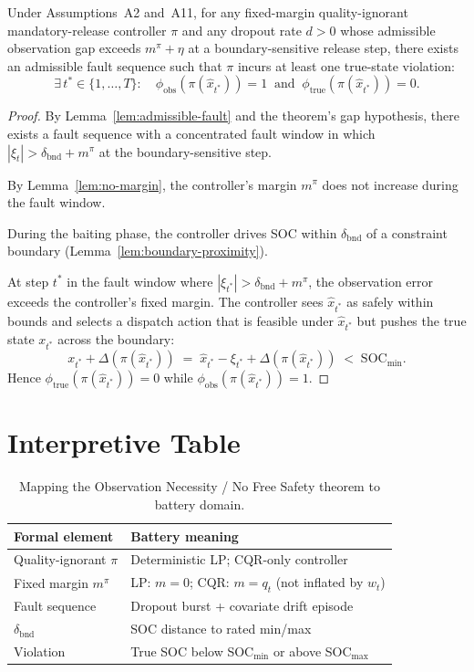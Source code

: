 \begin{theorem}
\label{thm:no-free-safety}
Under Assumptions~A2 and~A11, for any fixed-margin quality-ignorant
mandatory-release controller $\pi$ and any dropout rate $d > 0$ whose
admissible observation gap exceeds $m^\pi+\eta$ at a boundary-sensitive release
step, there exists an admissible fault sequence such that $\pi$ incurs at least
one true-state violation:
\[
  \exists\,t^* \in \{1, \ldots, T\} : \quad
  \phi_{\text{obs}}(\pi(\hat{x}_{t^*})) = 1 \;\;\text{and}\;\;
  \phi_{\text{true}}(\pi(\hat{x}_{t^*})) = 0.
\]
\end{theorem}

\begin{proof}
By Lemma~\ref{lem:admissible-fault} and the theorem's gap hypothesis, there
exists a fault sequence with a concentrated fault window in which
$|\xi_t| > \delta_{\text{bnd}}+m^\pi$ at the boundary-sensitive step.

By Lemma~\ref{lem:no-margin}, the controller's margin $m^{\pi}$ does
not increase during the fault window.

During the baiting phase, the controller drives SOC within
$\delta_{\text{bnd}}$ of a constraint boundary
(Lemma~\ref{lem:boundary-proximity}).

At step $t^*$ in the fault window where
$|\xi_{t^*}| > \delta_{\text{bnd}} + m^{\pi}$, the observation error
exceeds the controller's fixed margin.  The controller sees
$\hat{x}_{t^*}$ as safely within bounds and selects a dispatch action
that is feasible under $\hat{x}_{t^*}$ but pushes the true state
$x_{t^*}$ across the boundary:
\[
  x_{t^*} + \Delta(\pi(\hat{x}_{t^*}))
  \;=\; \hat{x}_{t^*} - \xi_{t^*} + \Delta(\pi(\hat{x}_{t^*}))
  \;<\; \text{SOC}_{\min}.
\]
Hence $\phi_{\text{true}}(\pi(\hat{x}_{t^*})) = 0$ while
$\phi_{\text{obs}}(\pi(\hat{x}_{t^*})) = 1$.
\end{proof}

\section{Interpretive Table}

\begin{table}[ht]
\centering
\caption{Mapping the Observation Necessity / No Free Safety theorem to battery domain.}
\label{tab:no-free-safety-interp}
\begin{tabular}{ll}
\toprule
\textbf{Formal element} & \textbf{Battery meaning} \\
\midrule
Quality-ignorant $\pi$ & Deterministic LP; CQR-only controller \\
Fixed margin $m^{\pi}$ & LP: $m = 0$; CQR: $m = q_t$ (not inflated by $w_t$) \\
Fault sequence & Dropout burst + covariate drift episode \\
$\delta_{\text{bnd}}$ & SOC distance to rated min/max \\
Violation & True SOC below SOC$_{\min}$ or above SOC$_{\max}$ \\
\bottomrule
\end{tabular}
\end{table}

